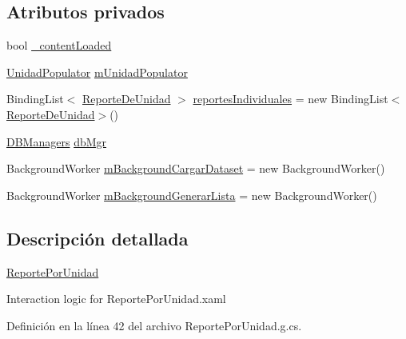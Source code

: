 \subsection*{Atributos privados}
\begin{DoxyCompactItemize}
\item 
bool \hyperlink{class_proyecto___integrador__3_1_1_reportes_1_1_reporte_por_unidad_afd92a2e129c768f1cf763c22165393d6}{\-\_\-content\-Loaded}
\item 
\hyperlink{_reporte_frecuencia_de_uso_8xaml_8cs_ac5564ac60b2bb0e1b9439f27d31948ac}{Unidad\-Populator} \hyperlink{class_proyecto___integrador__3_1_1_reportes_1_1_reporte_por_unidad_a66cc69a3144317fcc7b327c8b29baffd}{m\-Unidad\-Populator}
\item 
Binding\-List$<$ \hyperlink{class_proyecto___integrador__3_1_1_reportes_1_1_reporte_por_unidad_1_1_reporte_de_unidad}{Reporte\-De\-Unidad} $>$ \hyperlink{class_proyecto___integrador__3_1_1_reportes_1_1_reporte_por_unidad_a5560daa27ea781317cf7d38f9ce0a6fe}{reportes\-Individuales} = new Binding\-List$<$\hyperlink{class_proyecto___integrador__3_1_1_reportes_1_1_reporte_por_unidad_1_1_reporte_de_unidad}{Reporte\-De\-Unidad}$>$()
\item 
\hyperlink{class_proyecto___integrador__3_1_1_d_b_managers}{D\-B\-Managers} \hyperlink{class_proyecto___integrador__3_1_1_reportes_1_1_reporte_por_unidad_abd68a91cd0ccdc0740d0f3db2126c1e6}{db\-Mgr}
\item 
Background\-Worker \hyperlink{class_proyecto___integrador__3_1_1_reportes_1_1_reporte_por_unidad_af7637868838da0f9e0f02b266fde6c59}{m\-Background\-Cargar\-Dataset} = new Background\-Worker()
\item 
Background\-Worker \hyperlink{class_proyecto___integrador__3_1_1_reportes_1_1_reporte_por_unidad_a0df7b6ad6ce14f438848f0651d525261}{m\-Background\-Generar\-Lista} = new Background\-Worker()
\end{DoxyCompactItemize}


\subsection{Descripción detallada}
\hyperlink{class_proyecto___integrador__3_1_1_reportes_1_1_reporte_por_unidad}{Reporte\-Por\-Unidad} 

Interaction logic for Reporte\-Por\-Unidad.\-xaml 

Definición en la línea 42 del archivo Reporte\-Por\-Unidad.\-g.\-cs.



